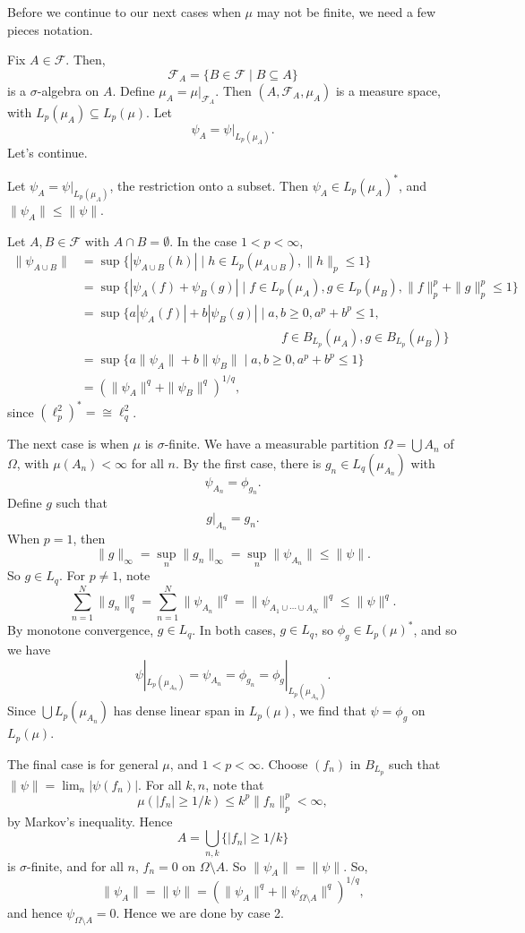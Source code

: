 \documentclass[12pt]{article}
\begin{document}
Before we continue to our next cases when $\mu$ may not be finite, we need a few pieces notation.

Fix $A \in \mathcal{F}$. Then,
\[
	\mathcal{F}_A = \{B \in \mathcal{F} \mid B \subseteq A\}
\]
is a $\sigma$-algebra on $A$. Define $\mu_A = \mu|_{\mathcal{F}_A}$. Then $(A, \mathcal{F}_A, \mu_A)$ is a measure space, with $L_p(\mu_A) \subseteq L_p(\mu)$. Let
\[
\psi_A = \psi|_{L_p(\mu_A)}.
\]
Let's continue.

\begin{proofbox}
	Let $\psi_A = \psi|_{L_p(\mu_A)}$, the restriction onto a subset. Then $\psi_A \in L_p(\mu_A)^\ast$, and $\|\psi_A\| \leq \|\psi\|$.

	Let $A, B \in \mathcal{F}$ with $A \cap B = \emptyset$. In the case $1 < p < \infty$,
	\begin{align*}
		\|\psi_{A \cup B}\| &= \sup \{|\psi_{A \cup B}(h)| \mid h \in L_p(\mu_{A \cup B}), \|h\|_p \leq 1\} \\
				    &= \sup\{|\psi_A(f) + \psi_B(g)| \mid f \in L_p(\mu_A), g \in L_p(\mu_B), \|f\|_p^p + \|g\|_p^p \leq 1\} \\
				    &= \sup\{a |\psi_A(f)| + b |\psi_B(g)| \mid a, b \geq 0, a^p + b^p \leq 1, \\
				    & \qquad \qquad \qquad \qquad \qquad \qquad \qquad \qquad f \in B_{L_p}(\mu_A), g \in B_{L_p}(\mu_B)\} \\
				    &= \sup\{a \|\psi_A\| + b \|\psi_B\| \mid a, b \geq 0, a^p + b^p \leq 1\} \\
				    &= (\|\psi_A\|^q + \|\psi_B\|^q)^{1/q},
	\end{align*}
	since $(\ell_p^2)^\ast = \cong \ell_q^2$.

	The next case is when $\mu$ is $\sigma$-finite. We have a measurable partition $\Omega = \bigcup A_n$ of $\Omega$, with $\mu(A_n) < \infty$ for all $n$. By the first case, there is $g_n \in L_q(\mu_{A_n})$ with
	\[
	\psi_{A_n} = \phi_{g_n}.
	\]
	Define $g$ such that
	\[
	g|_{A_n} = g_n.
	\]
	When $p = 1$, then
	\[
	\|g\|_\infty = \sup_{n} \|g_n\|_\infty = \sup_n \|\psi_{A_n}\| \leq \|\psi\|.
	\]
	So $g \in L_q$. For $p \neq 1$, note
	\[
	\sum_{n = 1}^N \|g_n\|_q^q = \sum_{n = 1}^N \|\psi_{A_n}\|^q = \|\psi_{A_1 \cup \cdots \cup A_N}\|^q \leq \|\psi\|^q.
	\]
	By monotone convergence, $g \in L_q$. In both cases, $g \in L_q$, so $\phi_g \in L_p(\mu)^\ast$, and so we have
	\[
	\psi|_{L_p(\mu_{A_n})} = \psi_{A_n} = \phi_{g_n} = \phi_g |_{L_p(\mu_{A_n})}.
	\]
	Since $\bigcup L_p(\mu_{A_n})$ has dense linear span in $L_p(\mu)$, we find that $\psi = \phi_g$ on $L_p(\mu)$.

	The final case is for general $\mu$, and $1 < p < \infty$. Choose $(f_n)$ in $B_{L_p}$ such that $\|\psi\| = \lim_n |\psi(f_n)|$. For all $k, n$, note that
	\[
	\mu(|f_n| \geq 1/k) \leq k^p \|f_n\|_p^p < \infty,
	\]
	by Markov's inequality. Hence
	\[
		A = \bigcup_{n, k}\{|f_n| \geq 1/k\}
	\]
	is $\sigma$-finite, and for all $n$, $f_n = 0$ on $\Omega \setminus A$. So $\|\psi_A\| = \|\psi\|$. So,
	\[
	\|\psi_A\| = \|\psi\| = (\|\psi_A\|^q + \|\psi_{\Omega \setminus A}\|^q)^{1/q},
	\]
	and hence $\psi_{\Omega\setminus A} = 0$. Hence we are done by case 2.
\end{proofbox}
\end{document}
